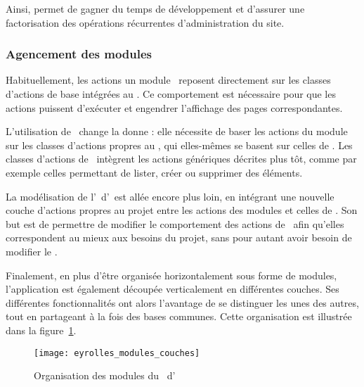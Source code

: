 Ainsi, \asladmin permet de gagner du temps de développement et d'assurer une factorisation des opérations récurrentes d'administration du site.


\subsubsection{Agencement des modules}

Habituellement, les actions un module \asf\ reposent directement sur les classes d'actions de base intégrées au \afm. Ce comportement est nécessaire pour que les actions puissent d'exécuter et engendrer l'affichage des pages correspondantes.

L'utilisation de \asladmin\ change la donne : elle nécessite de baser les actions du module sur les classes d'actions propres au \aplugin, qui elles-mêmes se basent sur celles de \asf. Les classes d'actions de \asladmin\ intègrent les actions génériques décrites plus tôt, comme par exemple celles permettant de lister, créer ou supprimer des éléments.

La modélisation de l'\aintranet\ d'\aey\ est allée encore plus loin, en intégrant une nouvelle couche d'actions propres au projet entre les actions des modules et celles de \asladmin. Son but est de permettre de modifier le comportement des actions de \asladmin\ afin qu'elles correspondent au mieux aux besoins du projet, sans pour autant avoir besoin de modifier le \aplugin.

Finalement, en plus d'être organisée horizontalement sous forme de modules, l'application est également découpée verticalement en différentes couches. Ses différentes fonctionnalités ont alors l'avantage de se distinguer les unes des autres, tout en partageant à la fois des bases communes. Cette organisation est illustrée dans la figure~\ref{figure:eyrolles_modules_couches}.

\begin{figure}
	\centering
	\texttt{[image: eyrolles\_modules\_couches]}
	\caption{Organisation des modules du \alotdeux\ d'\aey}
	\label{figure:eyrolles_modules_couches}
\end{figure}